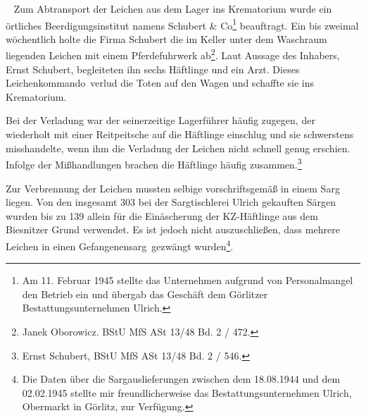 ~\newline
Zum Abtransport der Leichen aus dem Lager ins Krematorium wurde ein örtliches Beerdigungsinstitut namens Schubert \& Co\footnote{Am 11. Februar 1945 stellte das Unternehmen aufgrund von Personalmangel den Betrieb ein und übergab das Geschäft dem Görlitzer Bestattungsunternehmen Ulrich.} beauftragt. Ein bis zweimal wöchentlich holte die Firma Schubert die im Keller unter dem Waschraum liegenden Leichen mit einem Pferdefuhrwerk ab\footnote{Janek Oborowicz. BStU MfS ASt 13/48 Bd. 2 / 472.}. Laut Aussage des Inhabers, Ernst Schubert, begleiteten ihn sechs Häftlinge und ein Arzt. Dieses \glqq Leichenkommando\grqq~verlud die Toten auf den Wagen und schaffte sie ins Krematorium. 
\begin{leftbar} 
Bei der Verladung war der seinerzeitige Lagerführer häufig zugegen, der wiederholt mit einer Reitpeitsche auf die Häftlinge einschlug und sie schwerstens misshandelte, wenn ihm die Verladung der Leichen nicht schnell genug erschien. Infolge der Mißhandlungen brachen die Häftlinge häufig zusammen.\footnote{Ernst Schubert, BStU MfS ASt 13/48 Bd. 2 / 546.}
\end{leftbar}
Zur Verbrennung der Leichen mussten selbige vorschriftsgemäß in einem Sarg liegen. Von den insgesamt 303 bei der Sargtischlerei Ulrich gekauften Särgen wurden bis zu 139 allein für die Einäscherung der KZ-Häftlinge aus dem Biesnitzer Grund verwendet. Es ist jedoch nicht auszuschließen, dass mehrere Leichen in einen \glqq Gefangenensarg\grqq~gezwängt wurden\footnote{Die Daten über die Sargauslieferungen zwischen dem 18.08.1944 und dem 02.02.1945 stellte mir freundlicherweise das Bestattungsunternehmen Ulrich, Obermarkt in Görlitz, zur Verfügung.}.

